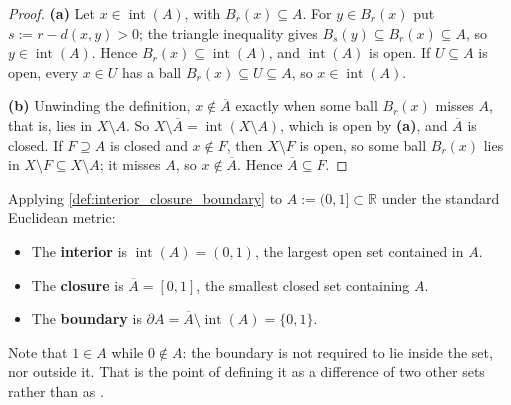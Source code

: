 \begin{proof}
\textbf{(a)} Let $x \in \operatorname{int}(A)$, with $B_r(x) \subseteq A$. For $y \in B_r(x)$
put $s := r - d(x,y) > 0$; the triangle inequality gives $B_s(y) \subseteq B_r(x) \subseteq A$,
so $y \in \operatorname{int}(A)$. Hence $B_r(x) \subseteq \operatorname{int}(A)$, and
$\operatorname{int}(A)$ is open. If $U \subseteq A$ is open, every $x \in U$ has a ball
$B_r(x) \subseteq U \subseteq A$, so $x \in \operatorname{int}(A)$.

\textbf{(b)} Unwinding the definition, $x \notin \overline{A}$ exactly when some ball $B_r(x)$
misses $A$, that is, lies in $X \setminus A$. So $X \setminus \overline{A} =
\operatorname{int}(X \setminus A)$, which is open by \textbf{(a)}, and $\overline{A}$ is closed.
If $F \supseteq A$ is closed and $x \notin F$, then $X \setminus F$ is open, so some ball
$B_r(x)$ lies in $X \setminus F \subseteq X \setminus A$; it misses $A$, so
$x \notin \overline{A}$. Hence $\overline{A} \subseteq F$.
\end{proof}

\begin{aiexample}
Applying \cref{def:interior_closure_boundary} to $A := (0,1] \subset \mathbb{R}$ under the
standard Euclidean metric:
\begin{itemize}
  \item The \textbf{interior} is $\operatorname{int}(A) = (0,1)$, the largest open set contained in $A$.
  \item The \textbf{closure} is $\overline{A} = [0,1]$, the smallest closed set containing $A$.
  \item The \textbf{boundary} is $\partial A = \overline{A} \setminus \operatorname{int}(A) = \{0, 1\}$.
\end{itemize}
Note that $1 \in A$ while $0 \notin A$: the boundary is not required to lie inside the set, nor
outside it. That is the point of defining it as a difference of two other sets rather than as
.
\end{aiexample}

